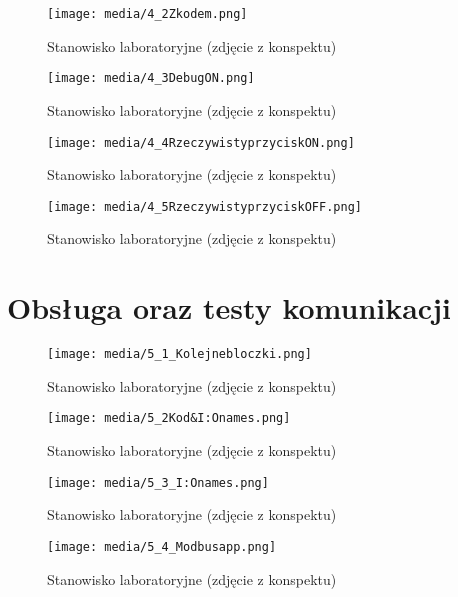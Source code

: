 \documentclass{article}
\begin{document}
\begin{figure}[H]
    \centering
    \texttt{[image: media/4\_2Zkodem.png]}
    \caption{Stanowisko laboratoryjne (zdjęcie z konspektu)}
    \label{fig:zdj3}
\end{figure}


\begin{figure}[H]
    \centering
    \texttt{[image: media/4\_3DebugON.png]}
    \caption{Stanowisko laboratoryjne (zdjęcie z konspektu)}
    \label{fig:zdj4}
\end{figure}

\begin{figure}[H]
    \centering
    \texttt{[image: media/4\_4RzeczywistyprzyciskON.png]}
    \caption{Stanowisko laboratoryjne (zdjęcie z konspektu)}
    \label{fig:zdj5}
\end{figure}

\begin{figure}[H]
    \centering
    \texttt{[image: media/4\_5RzeczywistyprzyciskOFF.png]}
    \caption{Stanowisko laboratoryjne (zdjęcie z konspektu)}
    \label{fig:zdj6}
\end{figure}


\newpage
\section{Obsługa oraz testy komunikacji}

\begin{figure}[H]
    \centering
    \texttt{[image: media/5\_1\_Kolejnebloczki.png]}
    \caption{Stanowisko laboratoryjne (zdjęcie z konspektu)}
    \label{fig:zdj7}
\end{figure}


\begin{figure}[H]
    \centering
    \texttt{[image: media/5\_2Kod\&I:Onames.png]}
    \caption{Stanowisko laboratoryjne (zdjęcie z konspektu)}
    \label{fig:zdj8}
\end{figure}


\begin{figure}[H]
    \centering
    \texttt{[image: media/5\_3\_I:Onames.png]}
    \caption{Stanowisko laboratoryjne (zdjęcie z konspektu)}
    \label{fig:zdj9}
\end{figure}


\begin{figure}[H]
    \centering
    \texttt{[image: media/5\_4\_Modbusapp.png]}
    \caption{Stanowisko laboratoryjne (zdjęcie z konspektu)}
    \label{fig:zdj10}
\end{figure}
\end{document}
